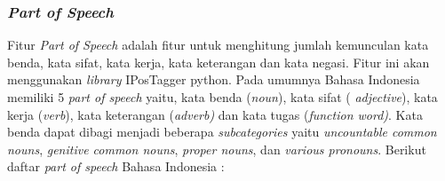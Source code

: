 \subsubsection{\textit{Part of Speech}}
Fitur \textit{Part of Speech }adalah fitur untuk menghitung jumlah 
kemunculan kata benda, kata sifat, kata kerja, kata keterangan dan kata 
negasi. Fitur ini\textit{ }akan menggunakan \textit{library} 
IPosTagger python. Pada umumnya Bahasa Indonesia memiliki 5 \textit{
	part of speech} yaitu, kata benda (\textit{noun}), kata sifat (
\textit{adjective}), kata kerja (\textit{verb}), kata keterangan 
(\textit{adverb)} dan kata tugas (\textit{function word)}. Kata 
benda dapat dibagi menjadi beberapa \textit{subcategories} yaitu 
\textit{uncountable common nouns},\textit{ genitive common nouns},
\textit{ proper nouns},\textit{ }dan \textit{various pronouns}. 
Berikut daftar \textit{part of speech }Bahasa Indonesia \cite{13}:

